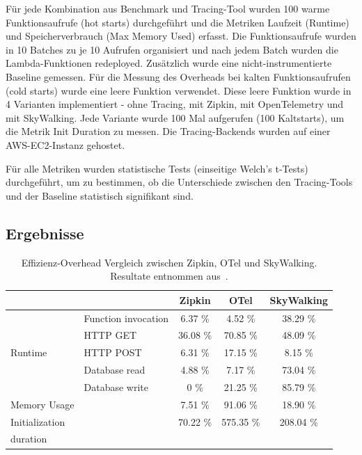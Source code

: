 Für jede Kombination aus Benchmark und Tracing-Tool wurden 100 warme Funktionsaufrufe 
(hot starts) durchgeführt und die Metriken Laufzeit (Runtime) und Speicherverbrauch (Max Memory Used) erfasst.
Die Funktionsaufrufe wurden in 10 Batches zu je 10 Aufrufen organisiert und nach jedem Batch wurden die Lambda-Funktionen redeployed. 
Zusätzlich wurde eine nicht-instrumentierte Baseline gemessen.
Für die Messung des Overheads bei kalten Funktionsaufrufen (cold starts) wurde eine leere Funktion verwendet. 
Diese leere Funktion wurde in 4 Varianten implementiert - ohne Tracing, mit Zipkin, mit OpenTelemetry und mit SkyWalking. 
Jede Variante wurde 100 Mal aufgerufen (100 Kaltstarts), um die Metrik Init Duration zu messen.
Die Tracing-Backends wurden auf einer AWS-EC2-Instanz gehostet.

Für alle Metriken wurden statistische Tests (einseitige Welch's t-Tests) durchgeführt, um zu bestimmen, ob die Unterschiede 
zwischen den Tracing-Tools und der Baseline statistisch signifikant sind.
\subsection{Ergebnisse}
\label{subsec:overhead-results}



\begin{table}[H]
\centering
\caption{Effizienz-Overhead Vergleich zwischen Zipkin, OTel und SkyWalking. Resultate entnommen aus~\cite{10254754}.}
\label{efficiency-overhead}
\begin{tabular}{llccc}
\toprule
 & & \textbf{Zipkin} & \textbf{OTel} & \textbf{SkyWalking} \\
\midrule
\multirow{5}{*}{Runtime} & Function invocation & 6.37 \% & 4.52 \% & \cellcolor{tablegray}38.29 \% \\
\cmidrule{2-5}
 & HTTP GET & \cellcolor{tablegray}36.08 \% & \cellcolor{tablegray}70.85 \% & \cellcolor{tablegray}48.09 \% \\
 & HTTP POST & 6.31 \% & 17.15 \% & 8.15 \% \\
\cmidrule{2-5}
 & Database read & 4.88 \% & 7.17 \% & \cellcolor{tablegray}73.04 \% \\
 & Database write & 0 \% & 21.25 \% & \cellcolor{tablegray}85.79 \% \\
\midrule
Memory Usage & & \cellcolor{tablegray}7.51 \% & \cellcolor{tablegray}91.06 \% & \cellcolor{tablegray}18.90 \% \\
\midrule
Initialization & & \cellcolor{tablegray}70.22 \% & \cellcolor{tablegray}575.35 \% & \cellcolor{tablegray}208.04 \% \\
duration & & & & \\
\bottomrule
\end{tabular}
\end{table}

